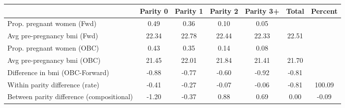 \begin{tabular}{l*{6}{c}}
\toprule
            &\multicolumn{1}{c}{Parity 0}&\multicolumn{1}{c}{Parity 1}&\multicolumn{1}{c}{Parity 2}&\multicolumn{1}{c}{Parity 3+}&\multicolumn{1}{c}{Total}&\multicolumn{1}{c}{Percent}\\
\midrule
\midrule
Prop. pregnant women (Fwd)&        0.49&        0.36&        0.10&        0.05&            &            \\
Avg pre-pregnancy bmi (Fwd)&       22.34&       22.78&       22.44&       22.33&       22.51&            \\
Prop. pregnant women (OBC)&        0.43&        0.35&        0.14&        0.08&            &            \\
Avg pre-pregnancy bmi (OBC)&       21.45&       22.01&       21.84&       21.41&       21.70&            \\
Difference in bmi (OBC-Forward)&       -0.88&       -0.77&       -0.60&       -0.92&       -0.81&            \\
Within parity difference (rate)&       -0.41&       -0.27&       -0.07&       -0.06&       -0.81&      100.09\\
Between parity difference (compositional)&       -1.20&       -0.37&        0.88&        0.69&        0.00&       -0.09\\
\bottomrule
\end{tabular}
